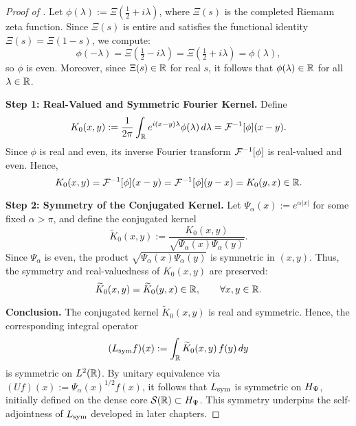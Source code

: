 \begin{proof}[Proof of ]
Let \( \phi(\lambda) := \Xi\left( \tfrac{1}{2} + i\lambda \right) \), where \( \Xi(s) \) is the completed Riemann zeta function. Since \( \Xi(s) \) is entire and satisfies the functional identity \( \Xi(s) = \Xi(1 - s) \), we compute:
\[
\phi(-\lambda) = \Xi\left( \tfrac{1}{2} - i\lambda \right) = \Xi\left( \tfrac{1}{2} + i\lambda \right) = \phi(\lambda),
\]
so \( \phi \) is even. Moreover, since \( \Xi(s) \in \mathbb{R} \) for real \( s \), it follows that \( \phi(\lambda) \in \mathbb{R} \) for all \( \lambda \in \mathbb{R} \).

\medskip
\noindent\textbf{Step 1: Real-Valued and Symmetric Fourier Kernel.}
Define
\[
K_0(x,y) := \frac{1}{2\pi} \int_{\mathbb{R}} e^{i(x - y)\lambda} \phi(\lambda)\, d\lambda = \mathcal{F}^{-1}[\phi](x - y).
\]
Since \( \phi \) is real and even, its inverse Fourier transform \( \mathcal{F}^{-1}[\phi] \) is real-valued and even. Hence,
\[
K_0(x,y) = \mathcal{F}^{-1}[\phi](x - y) = \mathcal{F}^{-1}[\phi](y - x) = K_0(y,x) \in \mathbb{R}.
\]

\medskip
\noindent\textbf{Step 2: Symmetry of the Conjugated Kernel.}
Let \( \Psi_\alpha(x) := e^{\alpha |x|} \) for some fixed \( \alpha > \pi \), and define the conjugated kernel
\[
\widetilde{K}_0(x,y) := \frac{K_0(x,y)}{\sqrt{\Psi_\alpha(x)\Psi_\alpha(y)}}.
\]
Since \( \Psi_\alpha \) is even, the product \( \sqrt{\Psi_\alpha(x)\Psi_\alpha(y)} \) is symmetric in \( (x,y) \). Thus, the symmetry and real-valuedness of \( K_0(x,y) \) are preserved:
\[
\widetilde{K}_0(x,y) = \widetilde{K}_0(y,x) \in \mathbb{R}, \qquad \forall x, y \in \mathbb{R}.
\]

\medskip
\noindent\textbf{Conclusion.}
The conjugated kernel \( \widetilde{K}_0(x,y) \) is real and symmetric. Hence, the corresponding integral operator
\[
(L_{\mathrm{sym}} f)(x) := \int_{\mathbb{R}} \widetilde{K}_0(x,y)\, f(y)\, dy
\]
is symmetric on \( L^2(\mathbb{R}) \). By unitary equivalence via \( (U f)(x) := \Psi_\alpha(x)^{1/2} f(x) \), it follows that \( L_{\mathrm{sym}} \) is symmetric on \( H_{\Psi} \), initially defined on the dense core \( \mathcal{S}(\mathbb{R}) \subset H_{\Psi} \). This symmetry underpins the self-adjointness of \( L_{\mathrm{sym}} \) developed in later chapters.
\end{proof}
